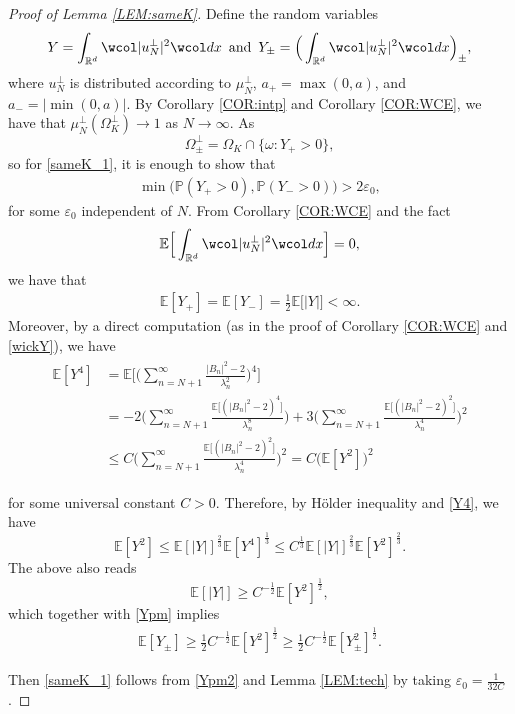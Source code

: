 \documentclass[%
11pt,  reqno]{amsart}
\theoremstyle{remarkstyle}
\newcommand{\1}{\hspace{0.2mm}\text{I}\hspace{0.2mm}}
\newcommand{\noi}{\noindent}
\newcommand{\R}{\mathbb{R}}
\newcommand{\E}{\mathbb{E}}
\newcommand{\eps}{\varepsilon}
\newcommand{\ld}{\lambda}
\newcommand{\wick}[1]{\wcol#1\wcol}
\renewcommand{\o}{\omega}
\renewcommand{\O}{\Omega}
\numberwithin{equation}{section}
\numberwithin{theorem}{section}
\begin{document}
	\begin{proof}[Proof of Lemma \ref{LEM:sameK}]
		Define the random variables 
		\begin{gather*}
			Y = \int_{\R^d} \wick{|u_N^\perp|^2}dx \, \textup{ and }\,
			Y_\pm = \Big(\int_{\R^d} \wick{|u_N^\perp|^2}dx\Big)_{\pm}, 
		\end{gather*}
		where $u_N^\perp$ is distributed according to $\mu_N^\perp$, $a_+ = \max (0,a)$, and $a_- = |\min (0,a)|$.
		By Corollary \ref{COR:intp} and Corollary \ref{COR:WCE}, we have that $\mu_N^\perp (\O_K^\perp) \to 1$ as $N\to \infty$. As 
		\[
		\O^\perp_\pm = \O_K \cap \{\o: Y_+ > 0\},
		\]
		so for \eqref{sameK_1}, it is enough to show that 
		\begin{align} 
			\label{same_K2} \min \big(\mathbb P(Y_+ > 0), \mathbb P(Y_- > 0) \big) > 2 \eps_0, \end{align}
		for some $\eps_0$ independent of $N$. 
		From Corollary \ref{COR:WCE} and the fact
		$$\E\Big[\int_{\R^d} \wick{|u_N^\perp|^2}dx\Big] = 0, $$
		we have that 
		\begin{align} 
			\label{Ypm}
			\E[Y_+] = \E[Y_-] = \frac12 \E \big[|Y| \big] < \infty.
		\end{align}
		Moreover, by a direct computation (as in the proof of Corollary \ref{COR:WCE} and \eqref{wickY}), we have
		\begin{align}
			\begin{split}
				\E [Y^4] & = \E \bigg[ \Big( \sum_{n=N+1}^\infty \frac{|B_n|^2 - 2}{\ld_n^2} \Big)^4 \bigg] \\
				& =  -2 \bigg(\sum_{n=N+1}^\infty \frac{\E \big[ (|B_n|^2 - 2)^4 \big] }{\ld_n^8}\bigg)  + 3  \bigg( \sum_{n =N+1}^\infty \frac{\E \big[(|B_n|^2 - 2)^2\big]  }{\ld_n^4}  \bigg)^2 \\
				& \le C \bigg( \sum_{n =N+1}^\infty \frac{\E \big[(|B_n|^2 - 2)^2\big]  }{\ld_n^4}  \bigg)^2  = C \big( \E [ Y^2]\big)^2
			\end{split}
			\label{Y4}
		\end{align}
		
		\noi 
		for some universal constant $C > 0$.
		Therefore, by H\"older inequality and \eqref{Y4}, we have
		$$ \E[Y^2] \le \E[|Y|]^\frac23 \E[Y^4]^\frac13 \le C^\frac13 \E[|Y|]^\frac23 \E[Y^2]^\frac23. $$
		The above also reads
		$$ \E[|Y|] \ge C^{-\frac12} \E[Y^2]^\frac12, $$
		which together with \eqref{Ypm} implies
		\begin{align}
			\label{Ypm2}
			\E [Y_\pm]  \ge \frac12 C^{-\frac12} \E[Y^2]^\frac12 \ge \frac12 C^{-\frac12} \E[Y^2_\pm]^\frac12.
		\end{align}
		
		\noi 
		Then \eqref{sameK_1} follows from \eqref{Ypm2} and Lemma \ref{LEM:tech} by taking $\eps_0 = \frac{1}{32C}$.
	\end{proof}
	
\end{document}
